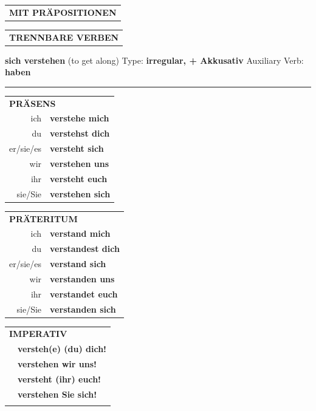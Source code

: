 \documentclass[10pt,a4paper]{revtex4-2}
\begin{document}
\begin{verbbox}
\vspace{10pt}

\begin{tabular}{lll}
\multicolumn{3}{l}{\textbf{MIT PRÄPOSITIONEN}}\\
\end{tabular}
\hfill
\begin{tabular}{lll}
\multicolumn{3}{l}{\textbf{TRENNBARE VERBEN}}\\
\end{tabular}
\vspace{-5pt}
\end{verbbox}

\begin{verbbox-acc}
        {\Large \bf sich verstehen} (to get along) \hfill Type: \textbf{irregular, + Akkusativ} \hfill Auxiliary Verb: \textbf{haben} 
    
       \vspace{5pt}

    \hrule
    
    \vspace{5pt}

  \begin{tabular}{rl}
     \multicolumn{2}{l}{\textbf{PRÄSENS} }\\
    ich & \textbf{verstehe mich}\\
    du & \textbf{verstehst dich}\\
    er/sie/es & \textbf{versteht sich}\\
    wir & \textbf{verstehen uns}\\
    ihr & \textbf{versteht euch}\\
    sie/Sie & \textbf{verstehen sich}\\
  \end{tabular}
  \hfill
     \begin{tabular}{rl}
    \multicolumn{2}{l}{\textbf{PRÄTERITUM} }\\
    ich & \textbf{verstand mich}\\
    du & \textbf{verstandest dich}\\
    er/sie/es & \textbf{verstand sich}\\
    wir & \textbf{verstanden uns}\\
    ihr & \textbf{verstandet euch}\\
    sie/Sie & \textbf{verstanden sich}\\
  \end{tabular}
  \hfill
  \begin{tabular}{rl}
     \multicolumn{2}{l}{\textbf{IMPERATIV} }\\
   & \textbf{versteh(e) (du) dich!}\\
   & \textbf{verstehen wir uns!}\\
   & \textbf{versteht (ihr) euch!}\\
   & \textbf{verstehen Sie sich!}\\
   & \vspace{10pt}
  \end{tabular}


\end{verbbox-acc}
\end{document}

